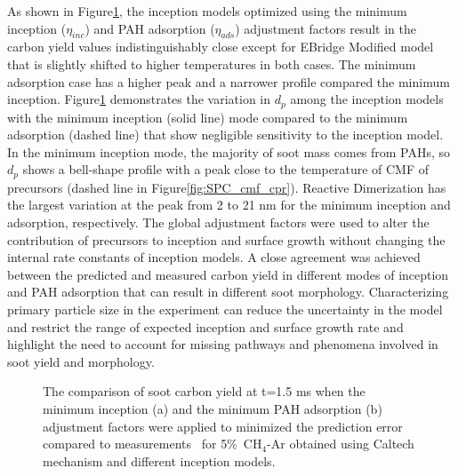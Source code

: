 As shown in Figure\ref{fig:shockagof_yield_maxincads_cpr}, the inception models optimized using the minimum inception ($\eta_{inc}$) and PAH adsorption ($\eta_{ads}$) adjustment factors result in the carbon yield values indistinguishably close except for EBridge Modified model that is slightly shifted to higher temperatures in both cases. The minimum adsorption case has a higher peak and a narrower profile compared the minimum inception. Figure\ref{fig:shockagof_yield_maxincads_cpr} demonstrates the variation in $d_p$ among the inception models with the minimum inception (solid line) mode compared to the minimum adsorption (dashed line) that show negligible sensitivity to the inception model. In the minimum inception mode, the majority of soot mass comes from PAHs, so $d_p$ shows a bell-shape profile with a peak close to the temperature of CMF of precursors (dashed line in Figure\ref{fig:SPC_cmf_cpr}). Reactive Dimerization has the largest variation at the peak from 2 to 21 nm for the minimum inception and adsorption, respectively. The global adjustment factors were used to alter the contribution of precursors to inception and surface growth without changing the internal rate constants of inception models. A close agreement was achieved between the predicted and measured carbon yield in different modes of inception and PAH adsorption that can result in different soot morphology. Characterizing primary particle size in the experiment can reduce the uncertainty in the model and restrict the range of expected inception and surface growth rate and highlight the need to account for missing pathways and phenomena involved in soot yield and morphology.

\begin{figure}[H]
	\centering
	\caption{The comparison of soot carbon yield at t=1.5 ms when the minimum inception (a) and the minimum PAH adsorption (b) adjustment factors were applied to minimized the prediction error compared to measurements~\citep{agafonov2016unified} for 5\%~$\mathrm{CH_4}$-Ar obtained using Caltech mechanism and different inception models.}
	\label{fig:shockagof_yield_maxincads_cpr} 
\end{figure}

